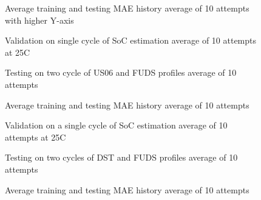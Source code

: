 \begin{figure*}[htbp]
    \centering
    \begin{subfigure}[b]{0.325\textwidth}
        \centering
        
        \caption{Average training and testing MAE history average of 10 attempts with higher Y-axis}
    \end{subfigure}
    \hfill
    \begin{subfigure}[b]{0.325\textwidth}
        \centering
        
        \caption{Validation on single cycle of SoC estimation average of 10 attempts at 25\textdegree{}C}
    \end{subfigure}
    \hfill
    \begin{subfigure}[b]{0.325\textwidth}
        \centering
        
        \caption{Testing on two cycle of US06 and FUDS profiles average of 10 attempts}
        \label{subfig:Model-5res-DSTvsFUDS}
    \end{subfigure}
    \begin{subfigure}[b]{0.325\textwidth}
        \centering
        
        \caption{Average training and testing MAE history average of 10 attempts}
    \end{subfigure}
    \hfill
    \begin{subfigure}[b]{0.325\textwidth}
        \centering
        
        \caption{Validation on a single cycle of SoC estimation average of 10 attempts at 25\textdegree{}C}
    \end{subfigure}
    \hfill
    \begin{subfigure}[b]{0.325\textwidth}
        \centering
        
        \caption{Testing on two cycles of DST and FUDS profiles average of 10 attempts}
    \end{subfigure}
    \begin{subfigure}[b]{0.325\textwidth}
        \centering
        
        \caption{Average training and testing MAE history average of 10 attempts}

\end{subfigure}
\end{figure*}
